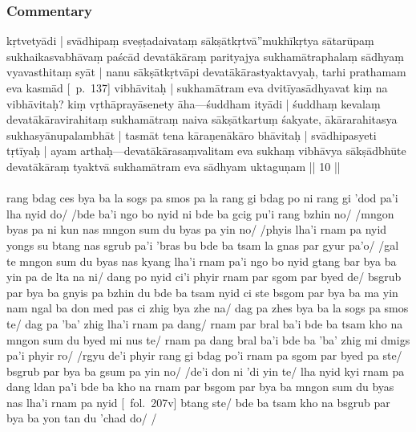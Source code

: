 \documentclass[12pt]{article}
\newcommand{\emdash} {\hspace{0em}—\hspace{0em}}
\begin{document}
\subsubsection{Commentary}
kṛtvetyādi | svādhipaṃ sveṣṭadaivataṃ sākṣātkṛtvā''mukhīkṛtya sātarūpaṃ sukhaikasvabhāvaṃ paścād devatākāraṃ parityajya sukhamātraphalaṃ sādhyaṃ vyavasthitaṃ syāt | nanu sākṣātkṛtvāpi devatākārastyaktavyaḥ, tarhi prathamam eva kasmād [\EDD\ p.\ 137] vibhāvitaḥ | sukhamātram eva dvitīyasādhyavat kiṃ na vibhāvitaḥ? kiṃ vṛthāprayāsenety āha\emdash śuddham ityādi | śuddhaṃ kevalaṃ devatākāravirahitaṃ sukhamātraṃ naiva sākṣātkartuṃ śakyate, ākārarahitasya sukhasyānupalambhāt | tasmāt tena kāraṇenākāro bhāvitaḥ | svādhipasyeti tṛtīyaḥ | ayam arthaḥ\emdash devatākārasaṃvalitam eva sukhaṃ vibhāvya sākṣādbhūte devatākāraṃ tyaktvā sukhamātram eva sādhyam uktaguṇam || 10 ||\\

\textbf{\TVA}\\
rang bdag ces bya ba la sogs pa smos pa la rang gi bdag po ni rang gi 'dod pa'i lha nyid do/ /bde ba'i ngo bo nyid ni bde ba gcig pu'i rang bzhin no/ /mngon byas pa ni kun nas mngon sum du byas pa yin no/ /phyis lha'i rnam pa nyid yongs su btang nas sgrub pa'i 'bras bu bde ba tsam la gnas par gyur pa'o/ /gal te mngon sum du byas nas kyang lha'i rnam pa'i ngo bo nyid gtang bar bya ba yin pa de lta na ni/ dang po nyid ci'i phyir rnam par sgom par byed de/ bsgrub par bya ba gnyis pa bzhin du bde ba tsam nyid ci ste bsgom par bya ba ma yin nam ngal ba don med pas ci zhig bya zhe na/ dag pa zhes bya ba la sogs pa smos te/ dag pa 'ba' zhig lha'i rnam pa dang/ rnam par bral ba'i bde ba tsam kho na mngon sum du byed mi nus te/ rnam pa dang bral ba'i bde ba 'ba' zhig mi dmigs pa'i phyir ro/ /rgyu de'i phyir rang gi bdag po'i rnam pa sgom par byed pa ste/ bsgrub par bya ba gsum pa yin no/ /de'i don ni 'di yin te/ lha nyid kyi rnam pa dang ldan pa'i bde ba kho na rnam par bsgom par bya ba mngon sum du byas nas lha'i rnam pa nyid [\TVA\ fol.\ 207v] btang ste/ bde ba tsam kho na bsgrub par bya ba yon tan du 'chad do/ /\\
\end{document}

